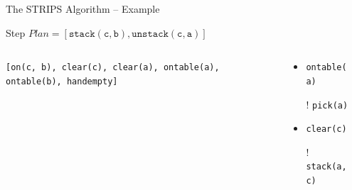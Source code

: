 \documentclass[presentation]{beamer}\mode<presentation>{\usetheme{AMSBolognaFC}}
\begin{document}
\begin{frame}[c]{The STRIPS Algorithm -- Example}
\small

\begin{exampleblock}{Step \nextStripsExampleStep{} \hfill $Plan = [\mathtt{stack(c,b),unstack(c,a)}]$}
	\begin{columns}[t]
		\begin{column}{.30\linewidth}\centering
			\texttt{[on(c, b), clear(c), clear(a), \alert{ontable(a)}, ontable(b), handempty]}
		\end{column}
		\begin{column}{.50\linewidth}\centering
			\begin{itemize}
				\item \alert{\texttt{ontable(a)}}
				\item[!] \texttt{pick(a)}
				\item \texttt{clear(c)}
				\item[!] \texttt{stack(a,c)}
			\end{itemize}
		\end{column}
		\begin{column}{.10\linewidth}\centering
			
		\end{column}
	\end{columns}
\end{exampleblock}

\end{frame}
\end{document}
